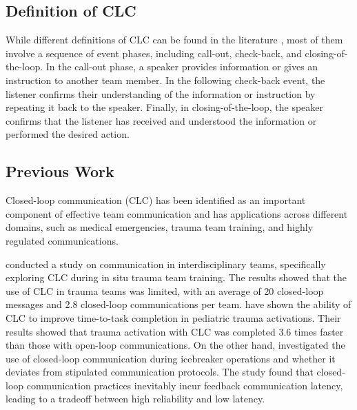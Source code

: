\documentclass[11pt]{article}
\begin{document}
\subsection{Definition of CLC}
While different definitions of CLC can be found in the literature \citep{marzuki2019closed, hargestam2016trauma, abd2018closed, bostrom2020mind}, most of them involve a sequence of event phases, including call-out, check-back, and closing-of-the-loop. In the call-out phase, a speaker provides information or gives an instruction to another team member. In the following check-back event, the listener confirms their understanding of the information or instruction by repeating it back to the speaker. Finally, in closing-of-the-loop, the speaker confirms that the listener has received and understood the information or performed the desired action. 

\subsection{Previous Work}
Closed-loop communication (CLC) has been identified as an important component of effective team communication and has applications across different domains, such as medical emergencies, trauma team training, and highly regulated communications. 

\citet{hargestam2016trauma} conducted a study on communication in interdisciplinary teams, specifically exploring CLC during in situ trauma team training. The results showed that the use of CLC in trauma teams was limited, with an average of 20 closed-loop messages and 2.8 closed-loop communications per team. \citet{abd2018closed} have shown the ability of CLC to improve time-to-task completion in pediatric trauma activations. Their results showed that trauma activation with CLC was completed 3.6 times faster than those with open-loop communications. On the other hand, \citet{bostrom2020mind} investigated the use of closed-loop communication during icebreaker operations and whether it deviates from stipulated communication protocols. The study found that closed-loop communication practices inevitably incur feedback communication latency, leading to a tradeoff between high reliability and low latency.
\end{document}
